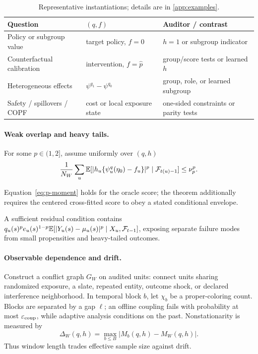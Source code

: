 \begin{table}[t]
\centering\small
\setlength{\tabcolsep}{3.5pt}
\begin{tabularx}{\linewidth}{@{}p{.25\linewidth}p{.28\linewidth}X@{}}
\toprule
Question & $(q,f)$ & Auditor / contrast \\
\midrule
Policy or subgroup value & target policy, $f=0$ & $h=1$ or subgroup indicator \\
Counterfactual calibration & intervention, $f=\widehat p$ & group/score tests or learned $h$ \\
Heterogeneous effects & $\psi^{q_1}-\psi^{q_0}$ & group, role, or learned subgroup \\
Safety / spillovers / COPF & cost or local exposure state & one-sided constraints or parity tests \\
\bottomrule
\end{tabularx}
\caption{Representative instantiations; details are in \cref{app:examples}.}
\label{tab:moment-examples}
\end{table}

\paragraph{Weak overlap and heavy tails.}
For some $p\in(1,2]$, assume uniformly over $(q,h)$
\begin{equation}
\frac1{N_W}\sum_u\mathbb{E}[|h_u\{\psi_u^q(\eta_0)-f_u\}|^p\mid\mathcal{F}_{t(u)-1}]\le\nu_p^p.
\label{eq:p-moment}
\end{equation}
\begin{assumption}
\label{ass:p-moment}
Equation~\eqref{eq:p-moment} holds for the oracle score; the theorem additionally requires the centered cross-fitted score to obey a stated conditional envelope.
\end{assumption}
A sufficient residual condition contains $q_u(s)^p e_u(s)^{1-p}\mathbb{E}[|Y_u(s)-\mu_u(s)|^p\mid X_u,\mathcal{F}_{t-1}]$, exposing separate failure modes from small propensities and heavy-tailed outcomes.

\paragraph{Observable dependence and drift.}
Construct a conflict graph $G_W$ on audited units: connect units sharing randomized exposure, a slate, repeated entity, outcome shock, or declared interference neighborhood. In temporal block $b$, let $\chi_b$ be a proper-coloring count. Blocks are separated by a gap $\ell$; an offline coupling fails with probability at most $\varepsilon_{\mathrm{coup}}$, while adaptive analysis conditions on the past. Nonstationarity is measured by
\begin{equation}
\Delta_W(q,h)=\max_{b\le B}|M_b(q,h)-M_W(q,h)|.
\label{eq:drift}
\end{equation}
Thus window length trades effective sample size against drift.
